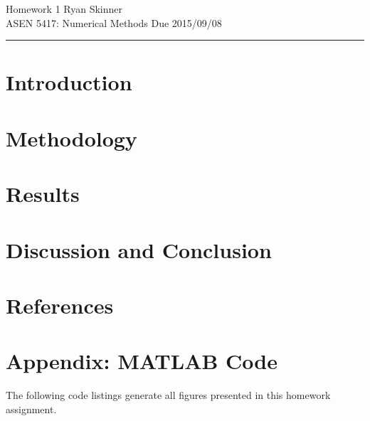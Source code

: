 \documentclass[11pt]{article}
\begin{document}
\pagestyle{fancyplain}
\lhead{}
\chead{}
\rhead{}
\cfoot{\thepage}

\noindent
{\Large \color{blue} Homework 1}
\hfill
{\large Ryan Skinner}
\\[0.5ex]
{\large ASEN 5417: Numerical Methods}
\hfill
{\large Due 2015/09/08}
\hrule
\vspace{12pt}

\section{Introduction}

\section{Methodology}

\section{Results}

\section{Discussion and Conclusion}

\section{References}

\section*{Appendix: MATLAB Code}
The following code listings generate all figures presented in this homework assignment.





\end{document}

